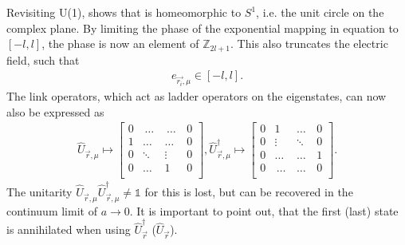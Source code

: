 Revisiting U(1), shows that is homeomorphic to $S^1$, i.e. the unit circle on the complex plane. By limiting the phase of the exponential mapping in equation  to $[-l, l]$, the phase is now an element of $\mathbb{Z}_{2l+1}$. This also truncates the electric field, such that
\begin{align}
e_{\vec{r_i}, \mu}\in[-l, l].
\end{align}
The link operators, which act as ladder operators on the eigenstates, can now also be expressed as
\begin{align*}
	\hat{U}_{\vec{r}, \mu} \mapsto \begin{bmatrix}
		                               0 & \,\dots\, & \,\dots \, & 0 \\
		                               1 & \dots     & \dots      & 0 \\
		                               0 & \ddots    & \vdots     & 0 \\
		                               0 & \dots     & 1          & 0 \\
	                               \end{bmatrix}, \hat{U}_{\vec{r}, \mu}^{\dag} \mapsto \begin{bmatrix}
		                                                                                    0 & 1          & \dots    & 0 \\
		                                                                                    0 & \vdots     & \ddots   & 0 \\
		                                                                                    0 & \dots      & \dots    & 1 \\
		                                                                                    0 & \,\dots \, & \dots \, & 0 \\
	                                                                                    \end{bmatrix}.
\end{align*}
The unitarity $\hat{U}_{\vec{r}, \mu}\hat{U}_{\vec{r}, \mu}^\dag\neq\mathds{1}$ for this is lost, but can be recovered in the continuum limit of $a\rightarrow0$. It is important to point out, that the first (last) state is annihilated when using $\hat{U}_{\vec{r}}^{\dag}$ ($\hat{U}_{\vec{r}}$).
